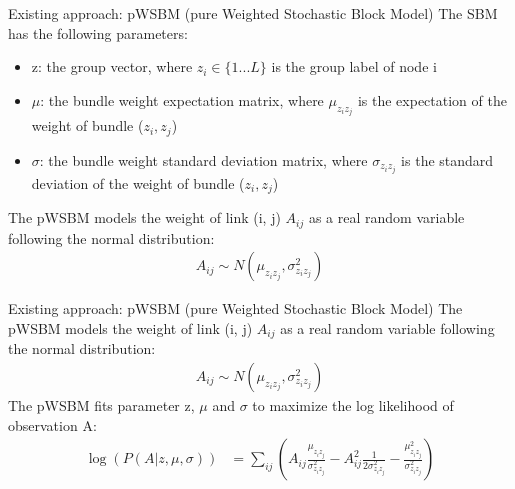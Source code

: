 \documentclass{beamer}
\begin{document}
\begin{frame}{Existing approach: pWSBM (pure Weighted Stochastic Block Model)}
	The SBM has the following parameters:
	\begin{itemize}
		\item z: the group vector,
		where $ z_i \in \{ 1 ... L \} $ is the group label of node i
		\item $ \mu $: the bundle weight expectation matrix,
		where $ \mu_{z_i z_j} $ is the expectation of the weight of bundle ($z_i, z_j$)
		\item $ \sigma $: the bundle weight standard deviation matrix,
		where $ \sigma_{z_i z_j} $ is the standard deviation of the weight of bundle ($z_i, z_j$)
	\end{itemize}
	The pWSBM models the weight of link (i, j) $ A_{ij} $ as a real random variable following the normal distribution:
	\begin{align*}
		A_{ij} \sim N(\mu_{z_i z_j}, \sigma_{z_i z_j}^2)
	\end{align*}
\end{frame}

\begin{frame}{Existing approach: pWSBM (pure Weighted Stochastic Block Model)}
	The pWSBM models the weight of link (i, j) $ A_{ij} $ as a real random variable following the normal distribution:
	\begin{align*}
		A_{ij} \sim N(\mu_{z_i z_j}, \sigma_{z_i z_j}^2)
	\end{align*}
	The pWSBM fits parameter z, $ \mu $ and $ \sigma $
	to maximize the log likelihood of observation A:
	\begin{align*}
		\log(P(A|z, \mu, \sigma))
		&= \sum_{ij} (
		A_{ij} \frac{\mu_{z_i z_j}}{\sigma_{z_i z_j}^2}
		- A_{ij}^2 \frac{1}{2\sigma_{z_i z_j}^2}
		- \frac{\mu_{z_i z_j}^2}{\sigma_{z_i z_j}^2}
		)
	\end{align*}
\end{frame}
\end{document}
